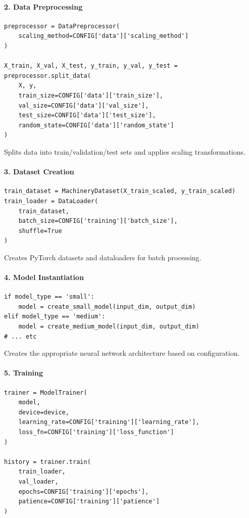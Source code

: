 \documentclass[11pt,a4paper]{article}
\begin{document}
\paragraph{2. Data Preprocessing}
\begin{lstlisting}
preprocessor = DataPreprocessor(
    scaling_method=CONFIG['data']['scaling_method']
)

X_train, X_val, X_test, y_train, y_val, y_test = preprocessor.split_data(
    X, y,
    train_size=CONFIG['data']['train_size'],
    val_size=CONFIG['data']['val_size'],
    test_size=CONFIG['data']['test_size'],
    random_state=CONFIG['data']['random_state']
)
\end{lstlisting}

Splits data into train/validation/test sets and applies scaling transformations.

\paragraph{3. Dataset Creation}
\begin{lstlisting}
train_dataset = MachineryDataset(X_train_scaled, y_train_scaled)
train_loader = DataLoader(
    train_dataset,
    batch_size=CONFIG['training']['batch_size'],
    shuffle=True
)
\end{lstlisting}

Creates PyTorch datasets and dataloaders for batch processing.

\paragraph{4. Model Instantiation}
\begin{lstlisting}
if model_type == 'small':
    model = create_small_model(input_dim, output_dim)
elif model_type == 'medium':
    model = create_medium_model(input_dim, output_dim)
# ... etc
\end{lstlisting}

Creates the appropriate neural network architecture based on configuration.

\paragraph{5. Training}
\begin{lstlisting}
trainer = ModelTrainer(
    model,
    device=device,
    learning_rate=CONFIG['training']['learning_rate'],
    loss_fn=CONFIG['training']['loss_function']
)

history = trainer.train(
    train_loader,
    val_loader,
    epochs=CONFIG['training']['epochs'],
    patience=CONFIG['training']['patience']
)
\end{lstlisting}
\end{document}

